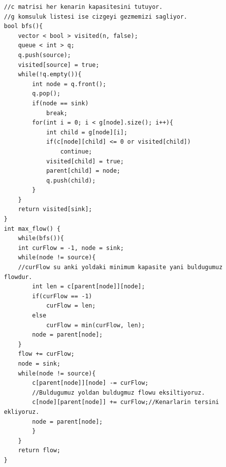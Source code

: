 \documentclass[12pt]{article}
\begin{document}
    \cleardoublepage
    \begin{verbatim}
//c matrisi her kenarin kapasitesini tutuyor.
//g komsuluk listesi ise cizgeyi gezmemizi sagliyor.
bool bfs(){
	vector < bool > visited(n, false);
	queue < int > q;
	q.push(source);
	visited[source] = true;
	while(!q.empty()){
		int node = q.front();
		q.pop();
		if(node == sink)
			break;
		for(int i = 0; i < g[node].size(); i++){
			int child = g[node][i];
			if(c[node][child] <= 0 or visited[child])
				continue;
			visited[child] = true;
			parent[child] = node;
			q.push(child);
		}
	}
	return visited[sink];
}
int max_flow() {
    while(bfs()){
	int curFlow = -1, node = sink;
	while(node != source){
	//curFlow su anki yoldaki minimum kapasite yani buldugumuz flowdur.
		int len = c[parent[node]][node];
		if(curFlow == -1)
			curFlow = len;
		else
			curFlow = min(curFlow, len);
		node = parent[node];
	}
	flow += curFlow;
	node = sink;
	while(node != source){
		c[parent[node]][node] -= curFlow;
		//Buldugumuz yoldan buldugmuz flowu eksiltiyoruz.
		c[node][parent[node]] += curFlow;//Kenarlarin tersini ekliyoruz.
		node = parent[node];
        }
    }
    return flow;
}
    \end{verbatim}
    
    \cleardoublepage
    
\end{document}
